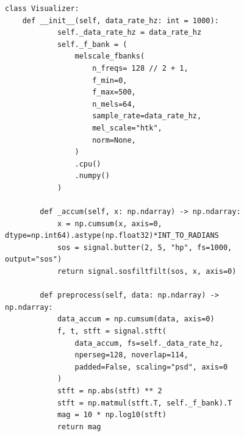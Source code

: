 \begin{figure}[htbp]
  \centering
  \begin{minipage}{\linewidth}
    \begin{lstlisting}[style=pythonstyle, caption={Core processing for converting raw phase data to magnitude output}, label=lst:mag_processing]
    class Visualizer:
    def __init__(self, data_rate_hz: int = 1000):
            self._data_rate_hz = data_rate_hz
            self._f_bank = (
                melscale_fbanks(
                    n_freqs= 128 // 2 + 1,
                    f_min=0,
                    f_max=500,
                    n_mels=64,
                    sample_rate=data_rate_hz,
                    mel_scale="htk",
                    norm=None,
                )
                .cpu()
                .numpy()
            )

        def _accum(self, x: np.ndarray) -> np.ndarray:
            x = np.cumsum(x, axis=0, dtype=np.int64).astype(np.float32)*INT_TO_RADIANS
            sos = signal.butter(2, 5, "hp", fs=1000, output="sos")
            return signal.sosfiltfilt(sos, x, axis=0)

        def preprocess(self, data: np.ndarray) -> np.ndarray:
            data_accum = np.cumsum(data, axis=0)
            f, t, stft = signal.stft(
                data_accum, fs=self._data_rate_hz,
                nperseg=128, noverlap=114,
                padded=False, scaling="psd", axis=0
            )
            stft = np.abs(stft) ** 2
            stft = np.matmul(stft.T, self._f_bank).T
            mag = 10 * np.log10(stft)
            return mag
    \end{lstlisting}
  \end{minipage}
\end{figure}

